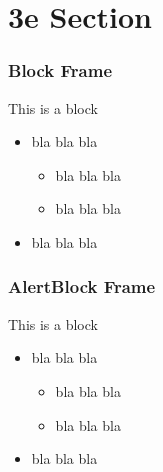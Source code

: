 \documentclass{beamer}
\begin{document}
\section[3e] { 3e Section }
\begin{frame}
\frametitle{Block Frame}

\begin{block}{This is a block}
\begin{itemize}
\item bla bla bla
  \begin{itemize}
    \item bla bla bla
    \item bla bla bla
  \end{itemize}
\item bla bla bla
\end{itemize}
\end{block}

\end{frame}
\begin{frame}
\frametitle{AlertBlock Frame}

\begin{alertblock}{This is a block}
\begin{itemize}
\item bla bla bla
  \begin{itemize}
    \item bla bla bla
    \item bla bla bla
  \end{itemize}
\item bla bla bla
\end{itemize}
\end{alertblock}

\end{frame}
\end{document}
